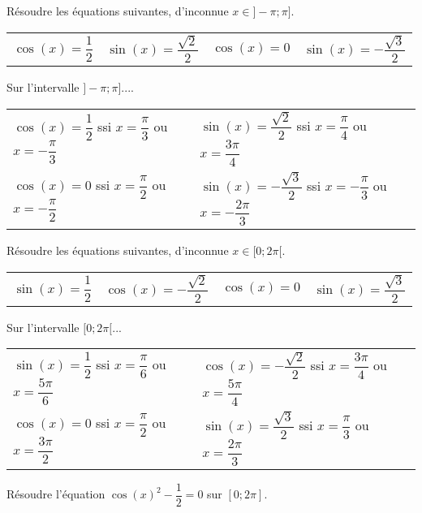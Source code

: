 \documentclass[11pt,fleqn, openany]{book} %
\begin{document}
\begin{exercise}Résoudre les équations suivantes, d'inconnue $x\in]-\pi;\pi]$.

\begin{tabularx}{\linewidth}{XXXX}
$\cos (x)=\dfrac{1}{2}$ & $\sin (x) = \dfrac{\sqrt{2}}{2}$ & $\cos (x)=0$ & $\sin (x)=-\dfrac{\sqrt{3}}{2}$
\end{tabularx}\end{exercise}

\begin{solution}Sur l'intervalle $]-\pi;\pi]$....

\begin{tabularx}{\linewidth}{XX}
$\cos (x)=\dfrac{1}{2}$ ssi $x=\dfrac{\pi}{3}$ ou $x=-\dfrac{\pi}{3}$ & $\sin (x) = \dfrac{\sqrt{2}}{2}$ ssi $x=\dfrac{\pi}{4}$ ou $x=\dfrac{3\pi}{4}$ \\ $\cos (x)=0$ ssi $x=\dfrac{\pi}{2}$ ou $x=-\dfrac{\pi}{2}$& $\sin (x)=-\dfrac{\sqrt{3}}{2}$ ssi $x=-\dfrac{\pi}{3}$ ou $x=-\dfrac{2\pi}{3}$
\end{tabularx}\end{solution}



\begin{exercise} Résoudre les équations suivantes, d'inconnue $x\in[0;2\pi[$.

\begin{tabularx}{\linewidth}{XXXX}
$\sin (x)=\dfrac{1}{2}$ & $\cos (x) = -\dfrac{\sqrt{2}}{2}$ & $\cos (x)=0$ & $\sin (x)=\dfrac{\sqrt{3}}{2}$
\end{tabularx}\end{exercise}

\begin{solution}Sur l'intervalle $[0;2\pi[$...

\begin{tabularx}{\linewidth}{XX}
$\sin (x)=\dfrac{1}{2}$ ssi $x=\dfrac{\pi}{6}$ ou $x=\dfrac{5\pi}{6}$ & $\cos (x) = -\dfrac{\sqrt{2}}{2}$ ssi $x=\dfrac{3\pi}{4}$ ou $x=\dfrac{5\pi}{4}$\\ $\cos (x)=0$ ssi $x=\dfrac{\pi}{2}$ ou $x=\dfrac{3\pi}{2}$ & $\sin (x)=\dfrac{\sqrt{3}}{2}$ ssi $x=\dfrac{\pi}{3}$ ou $x=\dfrac{2\pi}{3}$
\end{tabularx}\end{solution}




\begin{exercise}Résoudre l'équation $\cos(x)^2-\dfrac{1}{2}=0$ sur $[0;2\pi]$.\newpage \end{exercise}
\end{document}
